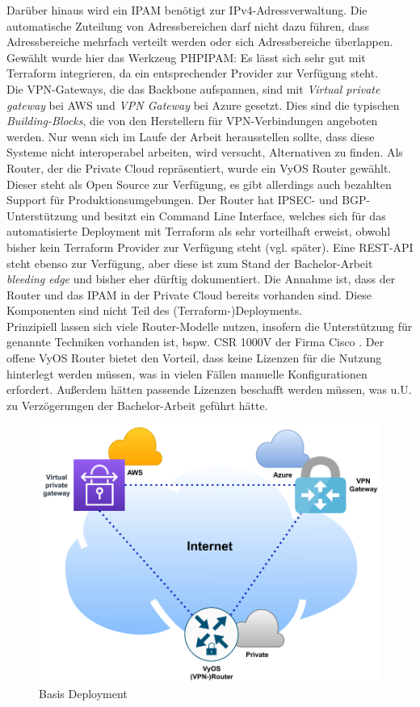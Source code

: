 Darüber hinaus wird ein IPAM benötigt zur IPv4-Adressverwaltung. Die automatische Zuteilung von Adressbereichen darf nicht dazu führen, dass Adressbereiche mehrfach verteilt werden oder sich Adressbereiche überlappen. Gewählt wurde hier das Werkzeug PHPIPAM: Es lässt sich sehr gut mit Terraform integrieren, da ein entsprechender Provider zur Verfügung steht.\\
Die VPN-Gateways, die das Backbone aufspannen, sind mit \textit{Virtual private gateway} bei AWS und \textit{VPN Gateway} bei Azure gesetzt. Dies sind die typischen \textit{Building-Blocks}, die von den Herstellern für VPN-Verbindungen angeboten werden. Nur wenn sich im Laufe der Arbeit herausstellen sollte, dass diese Systeme nicht interoperabel arbeiten, wird versucht, Alternativen zu finden. Als Router, der die Private Cloud repräsentiert, wurde ein VyOS Router gewählt. Dieser steht als Open Source zur Verfügung, es gibt allerdings auch bezahlten Support für Produktionsumgebungen. Der Router hat IPSEC- und BGP-Unterstützung und besitzt ein Command Line Interface, welches sich für das automatisierte Deployment mit Terraform als sehr vorteilhaft erweist, obwohl bisher kein Terraform Provider zur Verfügung steht (vgl. später). Eine REST-API steht ebenso zur Verfügung, aber diese ist zum Stand der Bachelor-Arbeit \textit{bleeding edge} und bisher eher dürftig dokumentiert. Die Annahme ist, dass der Router und das IPAM in der Private Cloud bereits vorhanden sind. Diese Komponenten sind nicht Teil des (Terraform-)Deployments.\\
Prinzipiell lassen sich viele Router-Modelle nutzen, insofern die Unterstützung für genannte Techniken vorhanden ist, bspw. CSR 1000V der Firma Cisco \cite{Durai2016}. Der offene VyOS Router bietet den Vorteil, dass keine Lizenzen für die Nutzung hinterlegt werden müssen, was in vielen Fällen manuelle Konfigurationen erfordert. Außerdem hätten passende Lizenzen beschafft werden müssen, was u.U. zu Verzögerungen der Bachelor-Arbeit geführt hätte.

\begin{figure}[h]
  \centering
  \includegraphics{Figures/Use-Case-1_Basis_Deployment.pdf}
  \caption{Basis Deployment}
  \label{grafik:Use-Case-1_Basis_Deployment}
\end{figure}


